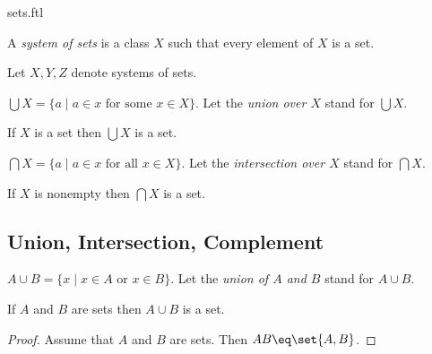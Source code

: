 \documentclass{article}
\begin{document}
\begin{smodule}{sets.ftl}
\begin{definition*}[forthel,id=SystemOfSetsDef,printid]
  A \emph{system of sets} is a class $X$ such that every element of $X$ is a set.
\end{definition*}

\begin{forthel}
  Let $X,Y,Z$ denote systems of sets.
\end{forthel}

\begin{definition*}[forthel,id=BigUnionDef,printid]
  $\bigcup X=\{a\mid a\in x\text{ for some  }x\in X\}$.
  Let the \emph{union over $X$} stand for $\bigcup X$.
\end{definition*}

\begin{axiom*}[forthel,title=Union Axiom,id=BigUnionAx,printid]
  If $X$ is a set then $\bigcup X$ is a set.
\end{axiom*}

\begin{definition*}[forthel,id=BigIntersectionDef,printid]
  $\bigcap X=\{a\mid a\in x\text{ for all }x\in X\}$.
  Let the \emph{intersection over $X$} stand for $\bigcap X$.
\end{definition*}

\begin{proposition*}[forthel,id=BigIntersectionProp,printid]
  If $X$ is nonempty then $\bigcap X$ is a set.
\end{proposition*}


\subsection{Union, Intersection, Complement}

\begin{definition*}[forthel,id=UnionDef,printid]
  $A\cup B=\{x\mid x\in A\text{ or }x\in B\}$.
  Let the \emph{union of $A$ and $B$} stand for $A\cup B$.
\end{definition*}

\begin{forthel}
  \begin{proposition*}[id=UnionProp,printid]
    If $A$ and $B$ are sets then $A\cup B$ is a set.
  \end{proposition*}
  \begin{proof}
    Assume that $A$ and $B$ are sets.
    Then $A\cup B\eq \bigcup\set{A,B}$.
  \end{proof}
\end{forthel}


\end{smodule}
\end{document}
